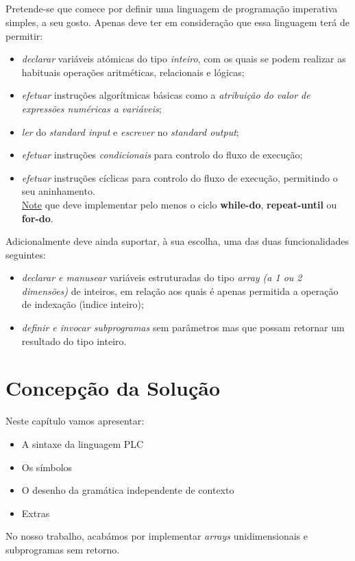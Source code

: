 \documentclass[11pt,a4paper]{report}
\begin{document}
    \paragraph{}
    Pretende-se que comece por definir uma linguagem de programação imperativa simples, a seu gosto.
    Apenas deve ter em consideração que essa linguagem terá de permitir:
    \begin{itemize}
        \item \textit{declarar} variáveis atómicas do tipo \textit{inteiro}, com os quais se podem realizar as habituais operações aritméticas, relacionais e lógicas;
        \item \textit{efetuar} instruções algorítmicas básicas como a \textit{atribuição do valor de expressões numéricas a variáveis};
        \item \textit{ler} do \textit{standard input} e \textit{escrever} no \textit{standard output};
        \item \textit{efetuar} instruções \textit{condicionais} para controlo do fluxo de execução;
        \item \textit{efetuar} instruções cíclicas para controlo do fluxo de execução, permitindo o seu aninhamento.\\
    \underline{Note} que deve implementar pelo menos o ciclo \textbf{while-do}, \textbf{repeat-until} ou \textbf{for-do}.
    \end{itemize}

    Adicionalmente deve ainda suportar, à sua escolha, uma das duas funcionalidades seguintes:
    \begin{itemize}
        \item \textit{declarar e manusear} variáveis estruturadas do tipo \textit{array (a 1 ou 2 dimensões)} de inteiros, em relação aos quais é apenas permitida a operação de indexação (ı́ndice inteiro);
        \item \textit{definir e invocar subprogramas} sem parâmetros mas que possam retornar um resultado do tipo inteiro.
    \end{itemize}


    \chapter{Concepção da Solução}
    Neste capítulo vamos apresentar:
    \begin{itemize}
        \item A sintaxe da linguagem PLC
        \item Os símbolos
        \item O desenho da gramática independente de contexto
        \item Extras
    \end{itemize}
    No nosso trabalho, acabámos por implementar \textit{arrays} unidimensionais e subprogramas sem retorno.
\end{document}
